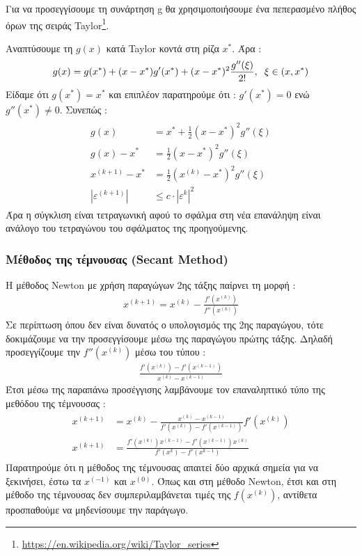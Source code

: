 \documentclass[a4paper,12pt,twoside]{report}
\theoremstyle{plain}
\theoremstyle{definition}
\theoremstyle{remark}
\begin{document}
Για να προσεγγίσουμε τη συνάρτηση g θα χρησιμοποιήσουμε ένα πεπερασμένο πλήθος όρων της σειράς Taylor\footnote{\url{https://en.wikipedia.org/wiki/Taylor\_series}}.

Αναπτύσουμε τη $g(x)$ κατά Taylor κοντά στη ρίζα $x^*$. Άρα :
\begin{align*}
g(x) = g(x^*) + (x-x^*)g'(x^*) + (x-x^*)^2\frac{g''(\xi)}{2!}, \hspace{0.2cm} \xi \in (x,x^*)
\end{align*}
Είδαμε ότι $g(x^*)=x^*$ και επιπλέον παρατηρούμε ότι : $g'(x^*)=0$ ενώ $g''(x^*)\neq 0$.
Συνεπώς :
\begin{align*}
\begin{split}
g(x) &= x^* + \frac{1}{2}(x-x^*)^2g''(\xi)\\
g(x) - x^* &= \frac{1}{2}(x-x^*)^2g''(\xi)\\
x^{(k+1)} - x^* &= \frac{1}{2}(x^{(k)}-x^*)^2g''(\xi)\\
|\varepsilon ^{(k+1)}| &\leq c\cdot|\varepsilon^k|^2
\end{split}
\end{align*}
Άρα η σύγκλιση είναι τετραγωνική αφού το σφάλμα στη νέα επανάληψη είναι ανάλογο του τετραγώνου του σφάλματος της προηγούμενης.

\subsubsection{Μέθοδος της τέμνουσας (Secant Method)}

Η μέθοδος Newton με χρήση παραγώγων 2ης τάξης παίρνει τη μορφή :
\begin{align*}
x^{(k+1)} = x^{(k)} - \frac{f'(x^{(k)})}{f''(x^{(k)})}
\end{align*}
Σε περίπτωση όπου δεν είναι δυνατός ο υπολογισμός της 2ης παραγώγου, τότε δοκιμάζουμε να την προσεγγίσουμε μέσω της παραγώγου πρώτης τάξης. Δηλαδή προσεγγίζουμε την $f''(x^{(k)})$ μέσω του τύπου :
\begin{align*}
\frac{f'(x^{(k)})-f'(x^{(k-1)})}{x^{(k)}-x^{(k-1)}}
\end{align*}
Έτσι μέσω της παραπάνω προσέγγισης λαμβάνουμε τον επαναληπτικό τύπο της μεθόδου της τέμνουσας :
\begin{align*}
\begin{split}
x^{(k+1)} &= x^{(k)} - \frac{x^{(k)}-x^{(k-1)}}{f'(x^{(k)})-f'(x^{(k-1)})}f'(x^{(k)})\\
x^{(k+1)} &= \frac{f'(x^{(k)})x^{(k-1)}-f'(x^{(k-1)})x^{(k)}}{f'(x^{k})-f'(x^{k-1})}
\end{split}
\end{align*}
Παρατηρούμε ότι η μέθοδος της τέμνουσας απαιτεί δύο αρχικά σημεία για να ξεκινήσει, έστω τα $x^{(-1)}$ και $x^{(0)}$. Όπως και στη μέθοδο Newton, έτσι και στη μέθοδο της τέμνουσας δεν συμπεριλαμβάνεται τιμές της $f(x^{(k)})$, αντίθετα προσπαθούμε να μηδενίσουμε την παράγωγο.
\end{document}
